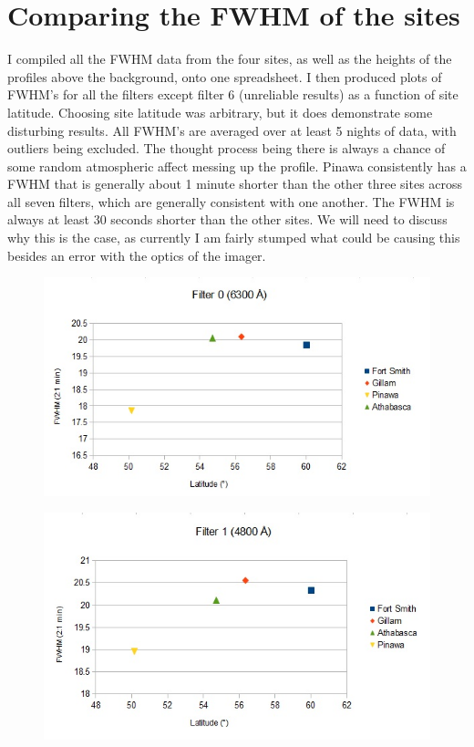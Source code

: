 \documentclass[11pt]{article}
\begin{document}
\section{Comparing the FWHM of the sites}

I compiled all the FWHM data from the four sites, as well as the heights of the profiles above the background, onto one spreadsheet. I then produced plots of FWHM's for all the filters except filter 6 (unreliable results) as a function of site latitude. Choosing site latitude was arbitrary, but it does demonstrate some disturbing results. All FWHM's are averaged over at least 5 nights of data, with outliers being excluded. The thought process being there is always a chance of some random atmospheric affect messing up the profile.  Pinawa consistently has a FWHM that is generally about 1 minute shorter than the other three sites across all seven filters, which are generally consistent with one another. The FWHM is always at least 30 seconds shorter than the other sites. We will need to discuss why this is the case, as currently I am fairly stumped what could be causing this besides an error with the optics of the imager. 

\begin{figure}[h!]
\includegraphics[scale=1.0]{filter0_FWHM.jpg}
\end{figure}

\begin{figure}[h!]
\includegraphics[scale=1.0]{filter1_FWHM.jpg}
\end{figure}
\end{document}
